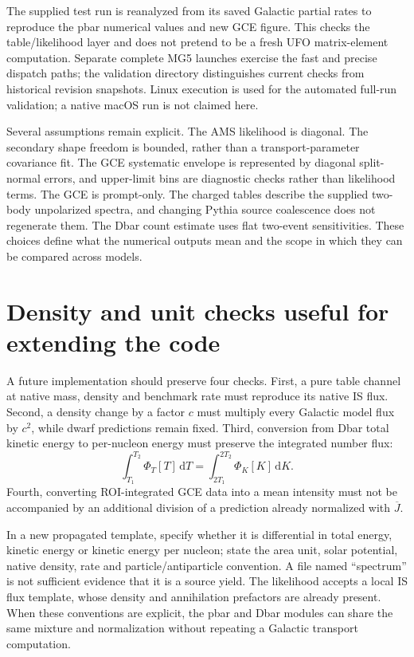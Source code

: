 \documentclass[11pt,a4paper]{article}
\newcommand{\dd}{\mathrm{d}}
\begin{document}
The supplied test run is reanalyzed from its saved Galactic partial rates to reproduce the pbar numerical values and new GCE figure. This checks the table/likelihood layer and does not pretend to be a fresh UFO matrix-element computation. Separate complete MG5 launches exercise the fast and precise dispatch paths; the validation directory distinguishes current checks from historical revision snapshots. Linux execution is used for the automated full-run validation; a native macOS run is not claimed here.

Several assumptions remain explicit. The AMS likelihood is diagonal. The secondary shape freedom is bounded, rather than a transport-parameter covariance fit. The GCE systematic envelope is represented by diagonal split-normal errors, and upper-limit bins are diagnostic checks rather than likelihood terms. The GCE is prompt-only. The charged tables describe the supplied two-body unpolarized spectra, and changing Pythia source coalescence does not regenerate them. The Dbar count estimate uses flat two-event sensitivities. These choices define what the numerical outputs mean and the scope in which they can be compared across models.

\appendix
\section{Density and unit checks useful for extending the code}
A future implementation should preserve four checks. First, a pure table channel at native mass, density and benchmark rate must reproduce its native IS flux. Second, a density change by a factor $c$ must multiply every Galactic model flux by $c^2$, while dwarf predictions remain fixed. Third, conversion from Dbar total kinetic energy to per-nucleon energy must preserve the integrated number flux:
\begin{equation}
\int_{T_1}^{T_2}\Phi_T[T]\,\dd T
=\int_{2T_1}^{2T_2}\Phi_K[K]\,\dd K.
\end{equation}
Fourth, converting ROI-integrated GCE data into a mean intensity must not be accompanied by an additional division of a prediction already normalized with $\overline J$.

In a new propagated template, specify whether it is differential in total energy, kinetic energy or kinetic energy per nucleon; state the area unit, solar potential, native density, rate and particle/antiparticle convention. A file named ``spectrum'' is not sufficient evidence that it is a source yield. The likelihood accepts a local IS flux template, whose density and annihilation prefactors are already present. When these conventions are explicit, the pbar and Dbar modules can share the same mixture and normalization without repeating a Galactic transport computation.
\end{document}
